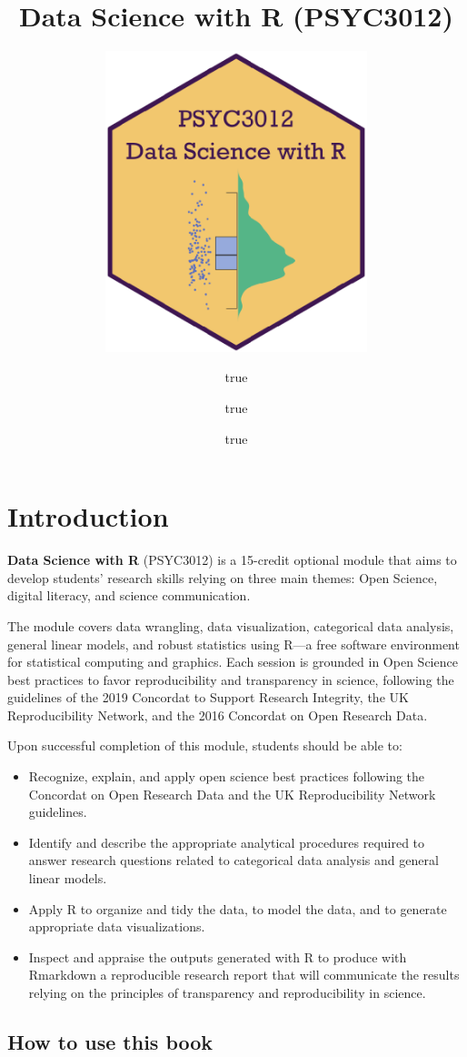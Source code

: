 \documentclass[
]{book}
\title{Data Science with R (PSYC3012)}
\subtitle{\includegraphics[width=3in,height=\textheight]{images/psyc3012_hex.png}}
\author{true \and true \and true}
\date{}
\providecommand{\tightlist}{%
  \setlength{\itemsep}{0pt}\setlength{\parskip}{0pt}}
\theoremstyle{definition}
\theoremstyle{definition}
\theoremstyle{definition}
\theoremstyle{definition}
\theoremstyle{remark}
\begin{document}
\maketitle

{
\setcounter{tocdepth}{1}
\tableofcontents
}
\hypertarget{introduction}{%
\chapter*{Introduction}\label{introduction}}

\textbf{Data Science with R} (PSYC3012) is a 15-credit optional module that aims to develop students' research skills relying on three main themes: Open Science, digital literacy, and science communication.

The module covers data wrangling, data visualization, categorical data analysis, general linear models, and robust statistics using R---a free software environment for statistical computing and graphics. Each session is grounded in Open Science best practices to favor reproducibility and transparency in science, following the guidelines of the 2019 Concordat to Support Research Integrity, the UK Reproducibility Network, and the 2016 Concordat on Open Research Data.

Upon successful completion of this module, students should be able to:

\begin{itemize}
\tightlist
\item
  Recognize, explain, and apply open science best practices following the Concordat on Open Research Data and the UK Reproducibility Network guidelines.
\item
  Identify and describe the appropriate analytical procedures required to answer research questions related to categorical data analysis and general linear models.
\item
  Apply R to organize and tidy the data, to model the data, and to generate appropriate data visualizations.
\item
  Inspect and appraise the outputs generated with R to produce with Rmarkdown a reproducible research report that will communicate the results relying on the principles of transparency and reproducibility in science.
\end{itemize}

\hypertarget{how-to-use-this-book}{%
\section*{How to use this book}\label{how-to-use-this-book}}
\end{document}
